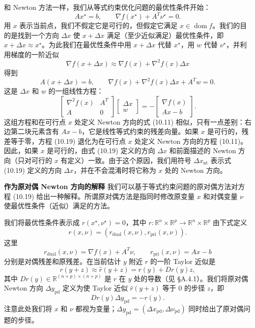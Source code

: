 \documentclass[UTF8,12pt,a4paper,fontset=fandol]{ctexart}
\begin{document}
和 Newton 方法一样，我们从等式约束优化问题的最优性条件开始：
\[
Ax^\star=b,\qquad \nabla f(x^\star)+A^T\nu^\star=0.
\]
用 $x$ 表示当前点，我们不假定它是可行的，但假定它满足 $x\in\operatorname{dom} f$。我们的目的是找到一个方向 $\Delta x$ 使 $x+\Delta x$ 满足（至少近似满足）最优性条件，即 $x+\Delta x\approx x^\star$。为此我们在最优性条件中用 $x+\Delta x$ 代替 $x^\star$，用 $w$ 代替 $\nu^\star$，并利用梯度的一阶近似
\[
\nabla f(x+\Delta x)\approx \nabla f(x)+\nabla^2 f(x)\Delta x
\]
得到
\[
A(x+\Delta x)=b,\qquad
\nabla f(x)+\nabla^2 f(x)\Delta x+A^Tw=0.
\]
这是 $\Delta x$ 和 $w$ 的一组线性方程：
\begin{equation}
\begin{bmatrix}
\nabla^2 f(x) & A^T\\
A & 0
\end{bmatrix}
\begin{bmatrix}
\Delta x\\
w
\end{bmatrix}
=-
\begin{bmatrix}
\nabla f(x)\\
Ax-b
\end{bmatrix}.
\tag{10.19}
\end{equation}
这组方程和在可行点 $x$ 处定义 Newton 方向的式 (10.11) 相似，只有一点差别：右边第二块元素含有 $Ax-b$，它是线性等式约束的残差向量。如果 $x$ 是可行的，残差等于零，方程 (10.19) 退化为在可行点 $x$ 处定义 Newton 方向的方程 (10.11)。因此，如果 $x$ 是可行的，由式 (10.19) 定义的方向 $\Delta x$ 和前面描述的 Newton 方向（只对可行的 $x$ 有定义）一致。由于这个原因，我们用符号 $\Delta x_{\mathrm{nt}}$ 表示式 (10.19) 定义的方向 $\Delta x$，并在不会混淆时将它称为 $x$ 处的 Newton 方向。

\noindent\textbf{作为原对偶 Newton 方向的解释}\quad
我们可以基于等式约束问题的原对偶方法对方程 (10.19) 给出一种解释。所谓原对偶方法是指同时修改原变量 $x$ 和对偶变量 $\nu$ 使最优性条件（近似）满足的方法。

我们将最优性条件表示成 $r(x^\star,\nu^\star)=0$，其中 $r:\mathbb{R}^n\times\mathbb{R}^p\to\mathbb{R}^n\times\mathbb{R}^p$ 由下式定义
\[
r(x,\nu)=(r_{\mathrm{dual}}(x,\nu),r_{\mathrm{pri}}(x,\nu)).
\]
这里
\[
r_{\mathrm{dual}}(x,\nu)=\nabla f(x)+A^T\nu,\qquad
r_{\mathrm{pri}}(x,\nu)=Ax-b
\]
分别是对偶残差和原残差。在当前估计 $y$ 附近 $r$ 的一阶 Taylor 近似是
\[
r(y+z)\approx \hat{r}(y+z)=r(y)+Dr(y)z,
\]
其中 $Dr(y)\in\mathbb{R}^{(n+p)\times(n+p)}$ 是 $r$ 在 $y$ 处的导数（见 \S A.4.1）。我们将原对偶 Newton 方向 $\Delta y_{\mathrm{pd}}$ 定义为使 Taylor 近似 $\hat{r}(y+z)$ 等于 $0$ 的步径 $z$，即
\begin{equation}
Dr(y)\Delta y_{\mathrm{pd}}=-r(y).
\tag{10.20}
\end{equation}
注意此处我们将 $x$ 和 $\nu$ 都视为变量；$\Delta y_{\mathrm{pd}}=(\Delta x_{\mathrm{pd}},\Delta\nu_{\mathrm{pd}})$ 同时给出了原对偶问题的步径。
\end{document}
